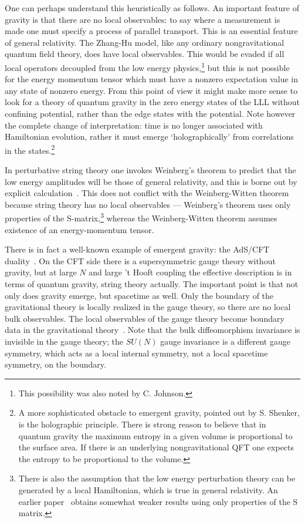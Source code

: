 \documentclass[a4paper,12pt]{article}
\begin{document}
One can perhaps understand this heuristically as follows.  An important
feature of gravity is that there are no local observables: to say where a
measurement is made one must specify a process of parallel transport.  This
is an essential feature of general relativity.  The Zhang-Hu model, like any
ordinary nongravitational quantum field theory, does have local 
observables. 
This would be evaded if all local operators decoupled from the low energy
physics,\footnote{This possibility was also noted by C. Johnson.} but this is
not possible for the energy momentum tensor which must have a nonzero
expectation value in any state of nonzero energy.  From this point of
view it might make more sense to look for a theory of quantum gravity in the
zero energy states of the LLL without confining potential, rather than the
edge states with the potential.  Note however the complete change of
interpretation: time is no longer associated with Hamiltonian evolution, 
rather it must emerge `holographically' from correlations in the
states.\footnote{A more sophisticated obstacle to emergent gravity, pointed
out by S. Shenker, is the holographic principle.  There is strong reason to
believe that in quantum gravity the maximum entropy in a given volume is
proportional to the surface area.  If there is an underlying nongravitational
QFT one expects the entropy to be proportional to the volume.}

In perturbative string
theory one invokes Weinberg's theorem to predict that the low energy amplitudes
will be those of general relativity, and this is borne out by explicit
calculation~\cite{scherk}.  This does not conflict with the Weinberg-Witten
theorem because string theory has no local observables --- Weinberg's theorem
uses only properties of the S-matrix,\footnote{There is also the assumption
that the low energy perturbation theory can be generated by a local
Hamiltonian, which is true in general relativity.  An earlier
paper~\cite{earlier} obtains somewhat weaker results using only properties of
the S matrix.} whereas the Weinberg-Witten theorem assumes existence
of an energy-momentum tensor.

There is in fact a well-known example of emergent gravity: the AdS/CFT
duality~\cite{malda}.  On the CFT side there is a supersymmetric gauge theory
without gravity, but at large $N$ and large 't Hooft coupling the effective
description is in terms of quantum gravity, string theory actually.  The
important point is that not only does gravity emerge, but spacetime as well. 
Only the boundary of the gravitational theory is locally realized in the gauge
theory, so there are no local bulk observables.  The local observables of the
gauge theory become boundary data in the gravitational theory~\cite{GKPW}.
Note that the bulk diffeomorphism invariance is invisible in the gauge
theory; the $SU(N)$ gauge invariance is a different gauge symmetry, which
acts as a local internal symmetry, not a local spacetime symmetry, on the
boundary.
\end{document}

